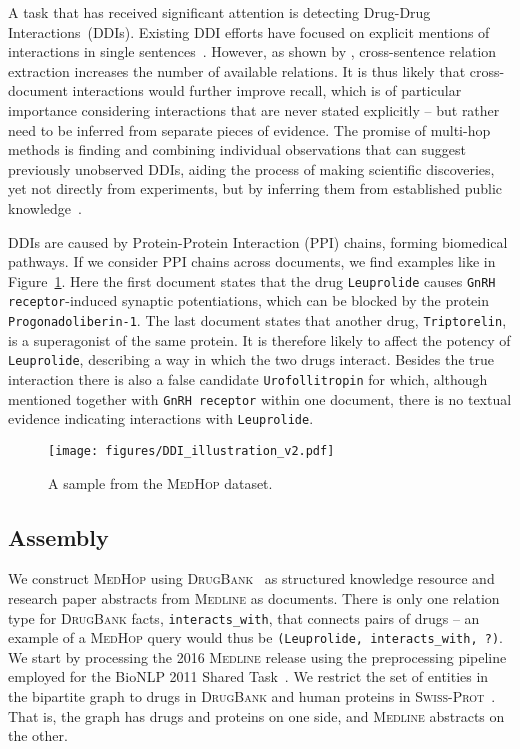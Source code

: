 \documentclass[11pt,letterpaper]{article}
\newcommand{\SwissProt}{\textsc{Swiss-Prot}\xspace}
\newcommand{\DrugBank}{\textsc{DrugBank}\xspace}
\newcommand{\MEDLINE}{\textsc{Medline}\xspace}
\newcommand{\MedHop}{\textsc{MedHop}\xspace}
\begin{document}
A task that has received significant attention is detecting Drug-Drug Interactions~(DDIs).
Existing DDI efforts have focused on explicit mentions of interactions in single sentences~\cite{gurulingappa12development,percha2012discovery,segurabedmar2013ddi}.
However, as shown by , cross-sentence relation extraction increases the number of available relations.
It is thus likely that cross-document interactions would further improve recall,  which is of particular importance considering interactions that are never stated explicitly -- but rather need to be inferred from separate pieces of evidence.
The promise of multi-hop methods is finding and combining individual observations that can suggest previously unobserved DDIs, aiding the process of making scientific discoveries, yet not directly from experiments, but by inferring them from established public knowledge~\cite{swanson1986undiscovered}.


DDIs are caused by Protein-Protein Interaction (PPI) chains, forming biomedical pathways.
If we consider PPI chains across documents, we find examples like in Figure~\ref{fig:medhop}.
Here the first document states that the drug {\smaller \texttt{Leuprolide}} causes {\smaller \texttt{GnRH receptor}}-induced synaptic potentiations, which can be blocked by the protein {\smaller \texttt{Progonadoliberin-1}}.
The last document states that another drug, {\smaller \texttt{Triptorelin}}, is a superagonist of the same protein.
It is therefore likely to affect the potency of {\smaller \texttt{Leuprolide}}, describing a way in which the two drugs interact.
Besides the true interaction there is also a false candidate {\smaller \texttt{Urofollitropin}} for which, although mentioned together with {\smaller \texttt{GnRH receptor}} within one document, there is no textual evidence indicating interactions with {\smaller \texttt{Leuprolide}}.

\begin{figure}[ht]
	\centering
\texttt{[image: figures/DDI\_illustration\_v2.pdf]}
	\caption{
	    A sample from the \MedHop dataset.
}
    \label{fig:medhop}
\end{figure}
\subsection{Assembly}
We construct \MedHop using \DrugBank~\cite{law2014drugbank} as structured knowledge resource and research paper abstracts from \MEDLINE as documents. 
There is only one relation type for \DrugBank facts, {\smaller \texttt{interacts\_with}}, that connects pairs of drugs -- an example of a \MedHop query would thus be \texttt{\smaller (Leuprolide, interacts\_with, ?)}.
We start by processing the 2016 \MEDLINE release using the preprocessing pipeline employed for the BioNLP 2011 Shared Task~\cite{stenetorp2011supporting}.
We restrict the set of entities in the bipartite graph to drugs in \DrugBank and human proteins in \SwissProt~\cite{bairoch2004swissprot}.
That is, the graph has drugs and proteins on one side, and \MEDLINE abstracts on the other.
\end{document}
